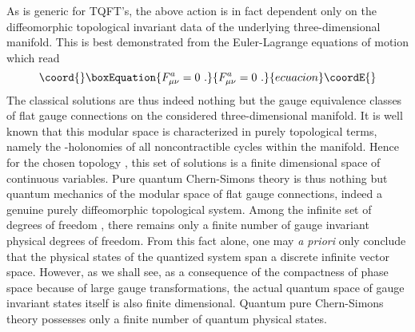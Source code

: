 \documentclass[a4paper,11pt]{article}
\def\R{\mathbb R}
\begin{document}
As is generic for TQFT's, the above action is in fact dependent
only on the diffeomorphic topological invariant data of the underlying
three-dimensional manifold. This is best demonstrated from the 
Euler-Lagrange equations of motion which read
\begin{equation}\coord{}\boxEquation{
F^a_{\mu\nu}=0\ .
}{
F^a_{\mu\nu}=0\ .
}{ecuacion}\coordE{}\end{equation}
The classical solutions are thus indeed nothing but the gauge equivalence
classes of flat gauge connections on the considered three-dimensional 
manifold. It is well known that this modular space is characterized in purely 
topological terms, namely the \coordHE{}-holonomies of all noncontractible cycles
within the manifold. Hence for the chosen topology \myHighlight{$\R\times\Sigma$}\coordHE{},
this set of solutions is a finite dimensional space of continuous variables. 
Pure quantum Chern-Simons theory is thus
nothing but quantum mechanics of the modular space of flat gauge connections,
indeed a genuine purely diffeomorphic topological system.\cite{Wit2} Among the
infinite set of degrees of freedom \coordHE{}, there remains only a finite
number of gauge invariant physical degrees of freedom. From this fact alone,
one may {\sl a priori\/} only conclude that the physical states of the 
quantized system span a discrete infinite vector space. However, as we
shall see, as a consequence of the compactness of phase space because of
large gauge transformations, the actual quantum space of gauge invariant
states itself is also finite dimensional. Quantum pure Chern-Simons theory
possesses only a finite number of quantum physical states.
\end{document}
